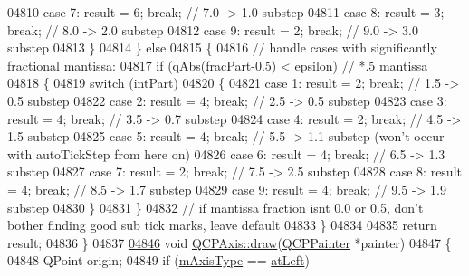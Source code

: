\begin{DoxyCode}
04810       \textcolor{keywordflow}{case} 7: result = 6; \textcolor{keywordflow}{break}; \textcolor{comment}{// 7.0 -> 1.0 substep}
04811       \textcolor{keywordflow}{case} 8: result = 3; \textcolor{keywordflow}{break}; \textcolor{comment}{// 8.0 -> 2.0 substep}
04812       \textcolor{keywordflow}{case} 9: result = 2; \textcolor{keywordflow}{break}; \textcolor{comment}{// 9.0 -> 3.0 substep}
04813     \}
04814   \} \textcolor{keywordflow}{else}
04815   \{
04816     \textcolor{comment}{// handle cases with significantly fractional mantissa:}
04817     \textcolor{keywordflow}{if} (qAbs(fracPart-0.5) < epsilon) \textcolor{comment}{// *.5 mantissa}
04818     \{
04819       \textcolor{keywordflow}{switch} (intPart)
04820       \{
04821         \textcolor{keywordflow}{case} 1: result = 2; \textcolor{keywordflow}{break}; \textcolor{comment}{// 1.5 -> 0.5 substep}
04822         \textcolor{keywordflow}{case} 2: result = 4; \textcolor{keywordflow}{break}; \textcolor{comment}{// 2.5 -> 0.5 substep}
04823         \textcolor{keywordflow}{case} 3: result = 4; \textcolor{keywordflow}{break}; \textcolor{comment}{// 3.5 -> 0.7 substep}
04824         \textcolor{keywordflow}{case} 4: result = 2; \textcolor{keywordflow}{break}; \textcolor{comment}{// 4.5 -> 1.5 substep}
04825         \textcolor{keywordflow}{case} 5: result = 4; \textcolor{keywordflow}{break}; \textcolor{comment}{// 5.5 -> 1.1 substep (won't occur with autoTickStep from here on)}
04826         \textcolor{keywordflow}{case} 6: result = 4; \textcolor{keywordflow}{break}; \textcolor{comment}{// 6.5 -> 1.3 substep}
04827         \textcolor{keywordflow}{case} 7: result = 2; \textcolor{keywordflow}{break}; \textcolor{comment}{// 7.5 -> 2.5 substep}
04828         \textcolor{keywordflow}{case} 8: result = 4; \textcolor{keywordflow}{break}; \textcolor{comment}{// 8.5 -> 1.7 substep}
04829         \textcolor{keywordflow}{case} 9: result = 4; \textcolor{keywordflow}{break}; \textcolor{comment}{// 9.5 -> 1.9 substep}
04830       \}
04831     \}
04832     \textcolor{comment}{// if mantissa fraction isnt 0.0 or 0.5, don't bother finding good sub tick marks, leave default}
04833   \}
04834   
04835   \textcolor{keywordflow}{return} result;
04836 \}
04837 
\hypertarget{a00115_source_l04846}{}\hyperlink{a00025_a258b1e783eda5cd14ec5552c696a424e}{04846} \textcolor{keywordtype}{void} \hyperlink{a00025_a258b1e783eda5cd14ec5552c696a424e}{QCPAxis::draw}(\hyperlink{a00047}{QCPPainter} *painter)
04847 \{
04848   QPoint origin;
04849   \textcolor{keywordflow}{if} (\hyperlink{a00025_ae704bf9f2c2b026f08dd4ccad79c616e}{mAxisType} == \hyperlink{a00025_ae2bcc1728b382f10f064612b368bc18aaf84aa6cac6fb6099f54a2cbf7546b730}{atLeft})

\end{DoxyCode}
